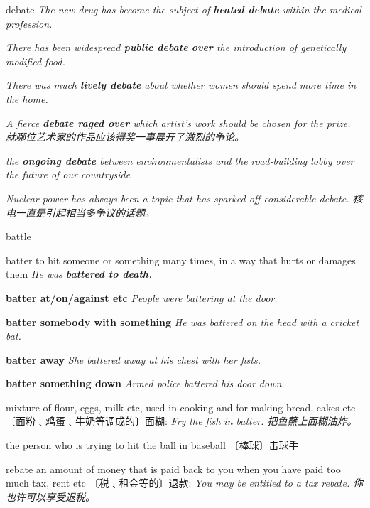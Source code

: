 \begin{DefWord}{debate}
\textit{The new drug has become the subject of \textbf{heated debate} within the medical profession.}

\textit{There has been widespread \textbf{public debate} \textbf{over} the introduction of genetically modified food.}

\textit{There was much \textbf{lively debate} about whether women should spend more time in the home.}

\textit{A fierce \textbf{debate raged over} which artist’s work should be chosen for the prize. 就哪位艺术家的作品应该得奖一事展开了激烈的争论。}

\textit{the \textbf{ongoing debate} between environmentalists and the road-building lobby over the future of our countryside}

\textit{Nuclear power has always been a topic that has sparked off considerable debate. 核电一直是引起相当多争议的话题。}



\end{DefWord}


\begin{DefWord}{battle}
\end{DefWord}

\begin{DefWord}{batter}
    to hit someone or something many times, in a way that hurts or damages them
    \textit{He was \textbf{battered to death.}}

    \textbf{batter at/on/against etc}
    \textit{People were battering at the door.}

    \textbf{batter somebody with something}
    \textit{He was battered on the head with a cricket bat.}

    \textbf{batter away}
    \textit{She battered away at his chest with her fists.}

    \textbf{batter something down}
    \textit{Armed police battered his door down.}

    mixture of flour, eggs, milk etc, used in cooking and for making bread, cakes etc 〔面粉﹑鸡蛋﹑牛奶等调成的〕面糊:
    \textit{Fry the fish in batter. 把鱼蘸上面糊油炸。}

    the person who is trying to hit the ball in baseball 〔棒球〕击球手
\end{DefWord}


\begin{DefWord}{rebate}
    an amount of money that is paid back to you when you have paid too much tax, rent etc 〔税﹑租金等的〕退款:
 \textit{You may be entitled to a tax rebate. 你也许可以享受退税。}
\end{DefWord}

